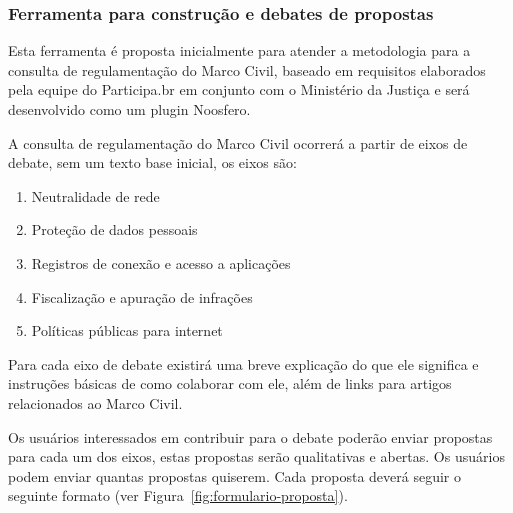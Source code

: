 \documentclass[12pt]{article}
\begin{document}
\subsubsection{Ferramenta para construção e debates de propostas}

Esta ferramenta é proposta inicialmente para atender a metodologia para a
consulta de regulamentação do Marco Civil, baseado em requisitos elaborados
pela equipe do Participa.br em conjunto com o Ministério da Justiça e será
desenvolvido como um plugin Noosfero.

A consulta de regulamentação do Marco Civil ocorrerá a partir de eixos de
debate, sem um texto base inicial, os eixos são:

\begin{enumerate}
  \item Neutralidade de rede
  \item Proteção de dados pessoais
  \item Registros de conexão e acesso a aplicações
  \item Fiscalização e apuração de infrações
  \item Políticas públicas para internet
\end{enumerate}

Para cada eixo de debate existirá uma breve explicação do que ele significa e
instruções básicas de como colaborar com ele, além de links para artigos
relacionados ao Marco Civil.

Os usuários interessados em contribuir para o debate poderão enviar propostas
para cada um dos eixos, estas propostas serão qualitativas e abertas. Os
usuários podem enviar quantas propostas quiserem. Cada proposta deverá seguir
o seguinte formato (ver Figura~\ref{fig:formulario-proposta}).
\end{document}
